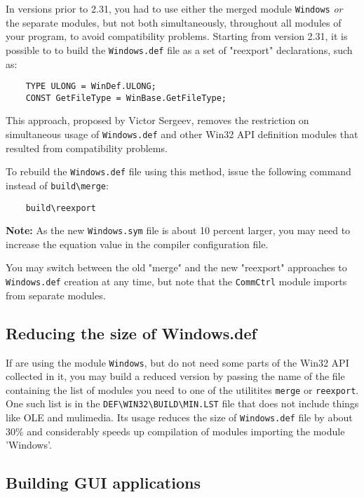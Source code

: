 In versions prior to 2.31, you had to use either the merged
module \verb'Windows' {\it or} the separate modules, but
not both simultaneously, throughout all modules of your program,
to avoid compatibility problems. Starting from version 2.31, it is possible to
to build the \verb'Windows.def' file as a set of "reexport"
declarations, such as:

\verb'    TYPE ULONG = WinDef.ULONG;'\\
\verb'    CONST GetFileType = WinBase.GetFileType;'

This approach, proposed by Victor Sergeev, removes the restriction
on simultaneous usage of \verb'Windows.def' and other Win32 API definition
modules that resulted from compatibility problems.

To rebuild the \verb'Windows.def' file using this method,
issue the following command instead of \verb'build\merge':

\verb'    build\reexport'

{\bf Note:} As the new \verb'Windows.sym' file is about 10 percent
      larger, you may need to increase the 
      equation value in the compiler configuration file.

You may switch between the old "merge" and the new "reexport"
approaches to \verb'Windows.def' creation at any time, but note
that the \verb'CommCtrl' module imports from separate modules.


\subsection{Reducing the size of Windows.def}


If are using the module \verb'Windows', but do not need some parts of the Win32 API
collected in it, you may build a reduced version by passing the name of the file
containing the list of modules you need to one of the utilitites \verb'merge' or
\verb'reexport'. One such list is in the \verb'DEF\WIN32\BUILD\MIN.LST' file that
does not include things like OLE and mulimedia. Its usage reduces the size of
\verb'Windows.def' file by about 30\% and considerably speeds up compilation of
modules importing the module 'Windows'.

\subsection{Building GUI applications}

